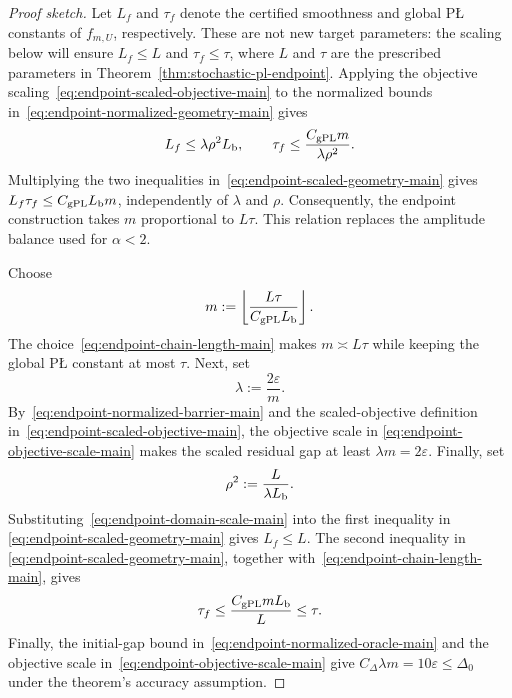 \documentclass[11pt]{article}
\begin{document}
\begin{proof}[Proof sketch]
Let $L_f$ and $\tau_f$ denote the certified smoothness and global P\L{} constants of $f_{m,U}$, respectively.
These are not new target parameters: the scaling below will ensure $L_f\le L$ and $\tau_f\le\tau$, where $L$ and
$\tau$ are the prescribed parameters in Theorem~\ref{thm:stochastic-pl-endpoint}. Applying the objective
scaling~\eqref{eq:endpoint-scaled-objective-main} to the normalized bounds
in~\eqref{eq:endpoint-normalized-geometry-main} gives
\begin{equation}
\label{eq:endpoint-scaled-geometry-main}
L_f\le\lambda\rho^2L_{\rm b},
\qquad
\tau_f\le\frac{C_{\mathrm{gPL}}m}{\lambda\rho^2}.
\end{equation}
Multiplying the two inequalities in~\eqref{eq:endpoint-scaled-geometry-main} gives
$L_f\tau_f\le C_{\mathrm{gPL}}L_{\rm b}m$, independently of \(\lambda\) and \(\rho\). Consequently, the endpoint
construction takes \(m\) proportional to \(L\tau\). This relation replaces the amplitude balance used for
\(\alpha<2\).

Choose
\begin{equation}
\label{eq:endpoint-chain-length-main}
m:=\left\lfloor\frac{L\tau}{C_{\mathrm{gPL}}L_{\rm b}}\right\rfloor.
\end{equation}
The choice~\eqref{eq:endpoint-chain-length-main} makes \(m\asymp L\tau\) while keeping the global P\L{} constant at
most \(\tau\). Next, set
\begin{equation}
\label{eq:endpoint-objective-scale-main}
\lambda:=\frac{2\varepsilon}{m}.
\end{equation}
By~\eqref{eq:endpoint-normalized-barrier-main} and the scaled-objective definition
in~\eqref{eq:endpoint-scaled-objective-main}, the objective scale in
\eqref{eq:endpoint-objective-scale-main} makes the scaled residual gap at least
\(\lambda m=2\varepsilon\). Finally, set
\begin{equation}
\label{eq:endpoint-domain-scale-main}
\rho^2:=\frac{L}{\lambda L_{\rm b}}.
\end{equation}
Substituting~\eqref{eq:endpoint-domain-scale-main} into the first inequality in
\eqref{eq:endpoint-scaled-geometry-main} gives \(L_f\le L\). The second inequality in
\eqref{eq:endpoint-scaled-geometry-main}, together with~\eqref{eq:endpoint-chain-length-main}, gives
\[
\tau_f\le\frac{C_{\mathrm{gPL}}mL_{\rm b}}{L}\le\tau.
\]
Finally, the initial-gap bound in~\eqref{eq:endpoint-normalized-oracle-main} and the objective scale
in~\eqref{eq:endpoint-objective-scale-main} give
$C_\Delta\lambda m=10\varepsilon\le\Delta_0$ under the theorem's accuracy assumption.


\end{proof}
\end{document}
